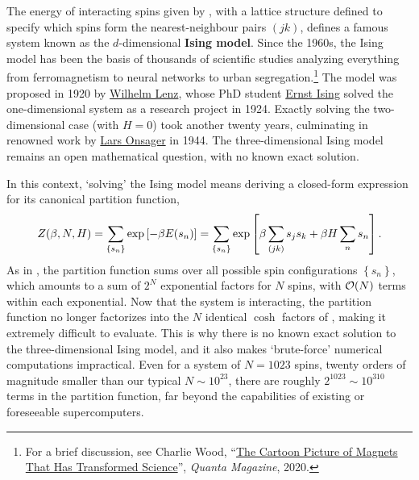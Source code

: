 The energy of interacting spins given by , with a lattice structure defined to specify which spins form the nearest-neighbour pairs $(jk)$, defines a famous system known as the $d$-dimensional \textbf{Ising model}.
Since the 1960s, the Ising model has been the basis of thousands of scientific studies analyzing everything from ferromagnetism to neural networks to urban segregation.\footnote{For a brief discussion, see Charlie Wood, ``\href{https://www.quantamagazine.org/the-cartoon-picture-of-magnets-that-has-transformed-science-20200624/}{The Cartoon Picture of Magnets That Has Transformed Science}'', \textit{Quanta Magazine}, 2020.}
The model was proposed in 1920 by \href{https://en.wikipedia.org/wiki/Wilhelm_Lenz}{Wilhelm Lenz}, whose PhD student \href{https://en.wikipedia.org/wiki/Ernst_Ising}{Ernst Ising} solved the one-dimensional system as a research project in 1924.
Exactly solving the two-dimensional case (with $H = 0$) took another twenty years, culminating in renowned work by \href{https://en.wikipedia.org/wiki/Lars_Onsager}{Lars Onsager} in 1944.
The three-dimensional Ising model remains an open mathematical question, with no known exact solution.

In this context, `solving' the Ising model means deriving a closed-form expression for its canonical partition function,
\begin{equation*}
  Z(\beta, N, H) = \sum_{\left\{s_n\right\}} \exp\left[-\beta E(s_n)\right] = \sum_{\left\{s_n\right\}} \exp\left[\beta\sum_{(jk)} s_j s_k + \beta H \sum_n s_n\right].
\end{equation*}
As in , the partition function sums over all possible spin configurations $\left\{s_n\right\}$, which amounts to a sum of $2^N$ exponential factors for $N$ spins, with $\mathcal O(N)$ terms within each exponential.
Now that the system is interacting, the partition function no longer factorizes into the $N$ identical $\cosh$ factors of , making it extremely difficult to evaluate.
This is why there is no known exact solution to the three-dimensional Ising model, and it also makes `brute-force' numerical computations impractical.
Even for a system of $N = 1023$ spins, twenty orders of magnitude smaller than our typical $N \sim 10^{23}$, there are roughly $2^{1023} \sim 10^{310}$ terms in the partition function, far beyond the capabilities of existing or foreseeable supercomputers.



